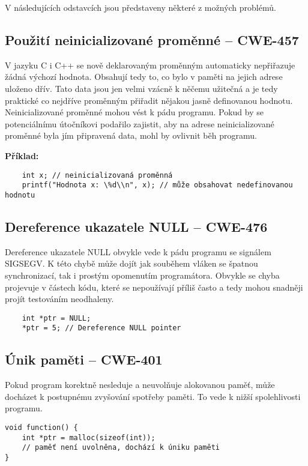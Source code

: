 \documentclass{article}
\begin{document}
V následujících odstavcích jsou představeny některé z možných problémů.

\subsection*{Použití neinicializované proměnné – CWE-457}

V jazyku C i C++ se nově deklarovaným proměnným automaticky nepřiřazuje žádná výchozí hodnota. Obsahují tedy to, co bylo v paměti na jejich adrese uloženo dřív. Tato data jsou jen velmi vzácně k něčemu užitečná a je tedy praktické co nejdříve proměnným přiřadit nějakou jasně definovanou hodnotu. Neinicializované proměnné mohou vést k pádu programu. Pokud by se potenciálnímu útočníkovi podařilo zajistit, aby na adrese neinicializované proměnné byla jím připravená data, mohl by ovlivnit běh programu.

\textbf{Příklad:}

	
\begin{verbatim}
	int x; // neinicializovaná proměnná
	printf("Hodnota x: \%d\\n", x); // může obsahovat nedefinovanou hodnotu
\end{verbatim}
	\subsection*{Dereference ukazatele NULL – CWE-476}
	
	Dereference ukazatele NULL obvykle vede k pádu programu se signálem SIGSEGV. K této chybě může dojít jak souběhem vláken se špatnou synchronizací, tak i prostým opomenutím programátora. Obvykle se chyba projevuje v částech kódu, které se nepoužívají příliš často a tedy mohou snadněji projít testováním neodhaleny.
	
\begin{verbatim}
	int *ptr = NULL;
	*ptr = 5; // Dereference NULL pointer
\end{verbatim}
	
\subsection*{Únik paměti – CWE-401}

Pokud program korektně nesleduje a neuvolňuje alokovanou paměť, může docházet k postupnému zvyšování spotřeby paměti. To vede k nižší spolehlivosti programu.

\begin{verbatim}
void function() {
	int *ptr = malloc(sizeof(int));
	// paměť není uvolněna, dochází k úniku paměti
}
\end{verbatim}
\end{document}
